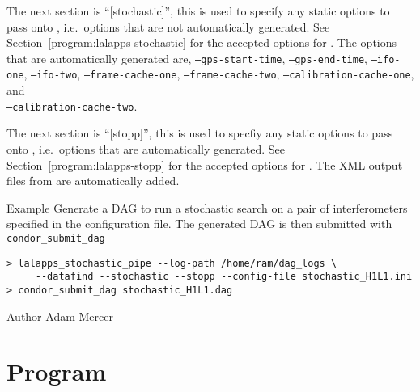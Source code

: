 \begin{entry}
The next section is ``[stochastic]'', this is used to specify any static
options to pass onto , i.e.~options that are
not automatically generated. See
Section~\ref{program:lalapps-stochastic} for the accepted options for
. The options that are automatically generated
are, \texttt{--gps-start-time}, \texttt{--gps-end-time},
\texttt{--ifo-one}, \texttt{--ifo-two}, \texttt{--frame-cache-one},
\texttt{--frame-cache-two}, \texttt{--calibration-cache-one}, and\\
\texttt{--calibration-cache-two}.

The next section is ``[stopp]'', this is used to specfiy any static
options to pass onto , i.e.~options that are
automatically generated. See Section~\ref{program:lalapps-stopp} for the
accepted options for . The XML output files from
 are automatically added.

\item[Example]
Generate a DAG to run a stochastic search on a pair of interferometers
specified in the configuration file. The generated DAG is then submitted
with \texttt{condor\_submit\_dag}

\begin{verbatim}
> lalapps_stochastic_pipe --log-path /home/ram/dag_logs \
     --datafind --stochastic --stopp --config-file stochastic_H1L1.ini
> condor_submit_dag stochastic_H1L1.dag
\end{verbatim}

\item[Author]
Adam Mercer
\end{entry}

\clearpage
\section{Program }
\label{program:lalapps-stochastic-bayes}

